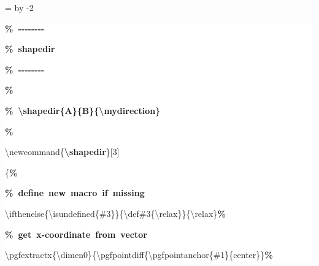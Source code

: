 \begingroup
\ttfamily
{}
=\textwidth
\advance{} by -2\fboxsep
\noindent
\colorbox{background}
{%
\parbox{\dimen255}
{%
\rule[-0.5ex]{0pt}{2.5ex}\hspace*{0.0em}\textcolor{G}{\textbf{\%~{-}{-}{-}{-}{-}{-}{-}{-}}}\\
\rule[-0.5ex]{0pt}{2.5ex}\hspace*{0.0em}\textcolor{G}{\textbf{\%~shapedir}}\\
\rule[-0.5ex]{0pt}{2.5ex}\hspace*{0.0em}\textcolor{G}{\textbf{\%~{-}{-}{-}{-}{-}{-}{-}{-}}}\\
\rule[-0.5ex]{0pt}{2.5ex}\hspace*{0.0em}\textcolor{G}{\textbf{\%}}\\
\rule[-0.5ex]{0pt}{2.5ex}\hspace*{0.0em}\textcolor{G}{\textbf{\%~\textbackslash{}shapedir\{A\}\{B\}\{\textbackslash{}mydirection\}}}\\
\rule[-0.5ex]{0pt}{2.5ex}\hspace*{0.0em}\textcolor{G}{\textbf{\%}}\\
\rule[-0.5ex]{0pt}{2.5ex}\hspace*{0.0em}\textbackslash{}newcommand\{\textcolor{R}{\textbf{\textbackslash{}shapedir}}\}[3]\\
\rule[-0.5ex]{0pt}{2.5ex}\hspace*{0.0em}\{\textcolor{G}{\textbf{\%}}\\
\rule[-0.5ex]{0pt}{2.5ex}\hspace*{1.0em}\textcolor{G}{\textbf{\%~define~new~macro~if~missing}}\\
\rule[-0.5ex]{0pt}{2.5ex}\hspace*{1.0em}\textbackslash{}ifthenelse\{\textbackslash{}isundefined\{\#3\}\}\{\textbackslash{}def\#3\{\textbackslash{}relax\}\}\{\textbackslash{}relax\}\textcolor{G}{\textbf{\%}}\\
\rule[-0.5ex]{0pt}{2.5ex}\hspace*{1.0em}\textcolor{G}{\textbf{\%~get~x{-}coordinate~from~vector}}\\
\rule[-0.5ex]{0pt}{2.5ex}\hspace*{1.0em}\textbackslash{}pgfextractx\{\textbackslash{}dimen0\}\{\textbackslash{}pgfpointdiff\{\textbackslash{}pgfpointanchor\{\#1\}\{center\}\}\textcolor{G}{\textbf{\%}}\\
}}
